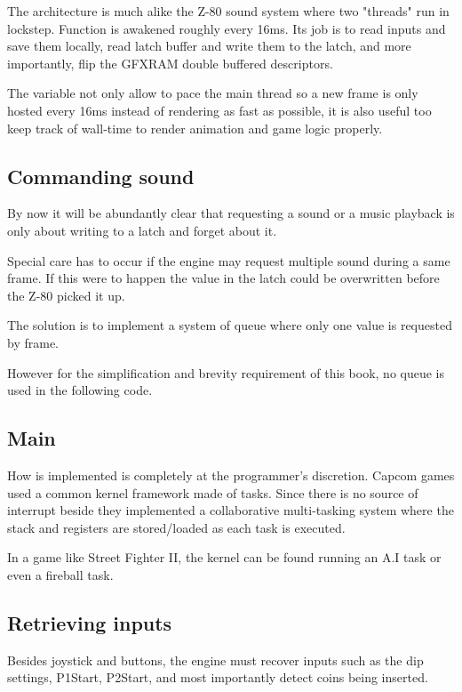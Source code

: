 The architecture is much alike the Z-80 sound system where two "threads" run in lockstep. Function  is awakened roughly every 16ms. Its job is to read inputs and save them locally, read latch buffer and write them to the latch, and more importantly, flip the GFXRAM double buffered descriptors. 

\begin{trivia}
The  variable not only allow to pace the main thread so a new frame is only hosted every 16ms instead of rendering as fast as possible, it is also useful too keep track of wall-time to render animation and game logic properly.
\end{trivia}


\subsection{Commanding sound}
By now it will be abundantly clear that requesting a sound or a music playback is only about writing to a latch and forget about it. 

Special care has to occur if the engine may request multiple sound during a same frame. If this were to happen the value in the latch could be overwritten before the Z-80 picked it up.

The solution is to implement a system of queue where only one value is requested by frame.

However for the simplification and brevity requirement of this book, no queue is used in the following code.

 

\subsection{Main}
 

How  is implemented is completely at the programmer's discretion. Capcom games used a common kernel framework made of tasks. Since there is no source of interrupt beside  they implemented a collaborative multi-tasking system where the stack and registers are stored/loaded as each task is executed.

In a game like Street Fighter II, the kernel can be found running an A.I task or even a fireball task\cite{sf2platinium}.

\subsection{Retrieving inputs}
Besides joystick and buttons, the engine must recover inputs such as the dip settings, P1Start, P2Start, and most importantly detect coins being inserted.

